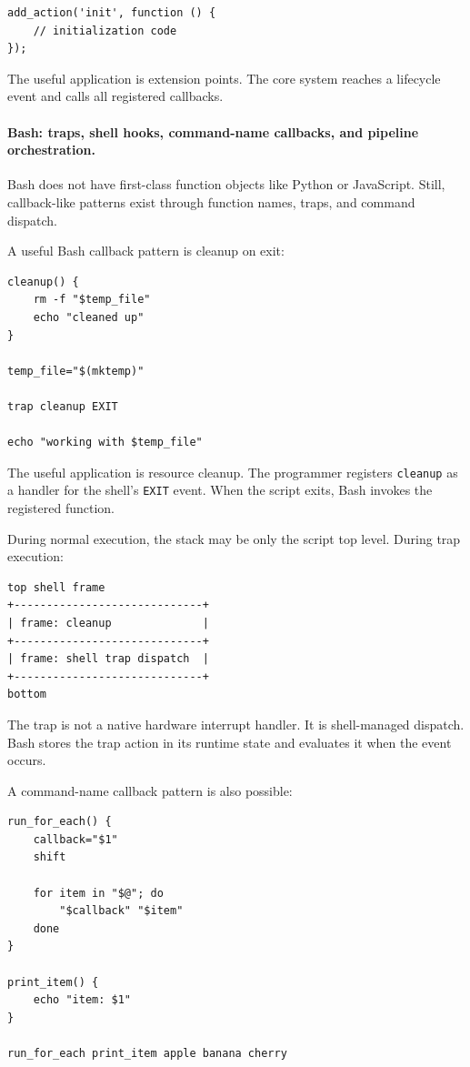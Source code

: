 \begin{verbatim}
add_action('init', function () {
    // initialization code
});
\end{verbatim}

The useful application is extension points. The core system reaches a lifecycle event and calls all registered callbacks.

\paragraph{Bash: traps, shell hooks, command-name callbacks, and pipeline orchestration.}

Bash does not have first-class function objects like Python or JavaScript. Still, callback-like patterns exist through function names, traps, and command dispatch.

A useful Bash callback pattern is cleanup on exit:

\begin{verbatim}
cleanup() {
    rm -f "$temp_file"
    echo "cleaned up"
}

temp_file="$(mktemp)"

trap cleanup EXIT

echo "working with $temp_file"
\end{verbatim}

The useful application is resource cleanup. The programmer registers \texttt{cleanup} as a handler for the shell's \texttt{EXIT} event. When the script exits, Bash invokes the registered function.

During normal execution, the stack may be only the script top level. During trap execution:

\begin{verbatim}
top shell frame
+-----------------------------+
| frame: cleanup              |
+-----------------------------+
| frame: shell trap dispatch  |
+-----------------------------+
bottom
\end{verbatim}

The trap is not a native hardware interrupt handler. It is shell-managed dispatch. Bash stores the trap action in its runtime state and evaluates it when the event occurs.

A command-name callback pattern is also possible:

\begin{verbatim}
run_for_each() {
    callback="$1"
    shift

    for item in "$@"; do
        "$callback" "$item"
    done
}

print_item() {
    echo "item: $1"
}

run_for_each print_item apple banana cherry
\end{verbatim}

